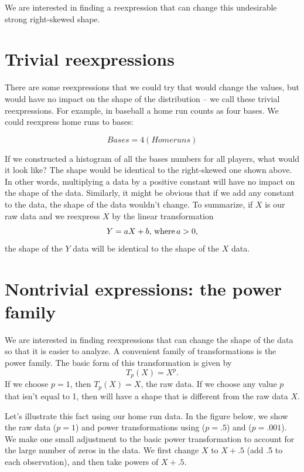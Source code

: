 \documentclass[
]{book}
\begin{document}
We are interested in finding a reexpression that can change this undesirable strong right-skewed shape.

\hypertarget{trivial-reexpressions}{%
\section{Trivial reexpressions}\label{trivial-reexpressions}}

There are some reexpressions that we could try that would change the values, but would have no impact on the shape of the distribution -- we call these trivial reexpressions. For example, in baseball a home run counts as four bases. We could reexpress home runs to bases:

\[
Bases = 4 (Home runs)
\]

If we constructed a histogram of all the bases numbers for all players, what would it look like? The shape would be identical to the right-skewed one shown above. In other words, multiplying a data by a positive constant will have no impact on the shape of the data. Similarly, it might be obvious that if we add any constant to the data, the shape of the data wouldn't change. To summarize, if \(X\) is our raw data and we reexpress \(X\) by the linear transformation
\[
Y = a X + b, \, {\rm where} \, a > 0,
\]
the shape of the \(Y\) data will be identical to the shape of the \(X\) data.

\hypertarget{nontrivial-expressions-the-power-family}{%
\section{Nontrivial expressions: the power family}\label{nontrivial-expressions-the-power-family}}

We are interested in finding reexpressions that can change the shape of the data so that it is easier to analyze. A convenient family of transformations is the power family. The basic form of this transformation is given by
\[
T_p(X) = X^p.
\]
If we choose \(p = 1\), then \(T_p(X) = X\), the raw data. If we choose any value \(p\) that isn't equal to 1, then will have a shape that is different from the raw data \(X\).

Let's illustrate this fact using our home run data. In the figure below, we show the raw data (\(p = 1\)) and power transformations using (\(p = .5\)) and (\(p = .001\)). We make one small adjustment to the basic power transformation to account for the large number of zeros in the data. We first change \(X\) to \(X + .5\) (add .5 to each observation), and then take powers of \(X + .5\).
\end{document}
